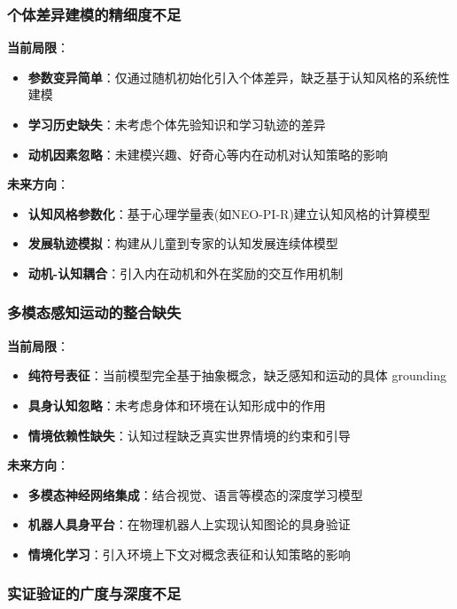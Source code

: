 \documentclass[12pt,a4paper]{article}
\begin{document}
\subsubsection{个体差异建模的精细度不足}

\textbf{当前局限}：
\begin{itemize}
\item \textbf{参数变异简单}：仅通过随机初始化引入个体差异，缺乏基于认知风格的系统性建模
\item \textbf{学习历史缺失}：未考虑个体先验知识和学习轨迹的差异
\item \textbf{动机因素忽略}：未建模兴趣、好奇心等内在动机对认知策略的影响
\end{itemize}

\textbf{未来方向}：
\begin{itemize}
\item \textbf{认知风格参数化}：基于心理学量表(如NEO-PI-R)建立认知风格的计算模型
\item \textbf{发展轨迹模拟}：构建从儿童到专家的认知发展连续体模型
\item \textbf{动机-认知耦合}：引入内在动机和外在奖励的交互作用机制
\end{itemize}

\subsubsection{多模态感知运动的整合缺失}

\textbf{当前局限}：
\begin{itemize}
\item \textbf{纯符号表征}：当前模型完全基于抽象概念，缺乏感知和运动的具体 grounding
\item \textbf{具身认知忽略}：未考虑身体和环境在认知形成中的作用
\item \textbf{情境依赖性缺失}：认知过程缺乏真实世界情境的约束和引导
\end{itemize}

\textbf{未来方向}：
\begin{itemize}
\item \textbf{多模态神经网络集成}：结合视觉、语言等模态的深度学习模型
\item \textbf{机器人具身平台}：在物理机器人上实现认知图论的具身验证
\item \textbf{情境化学习}：引入环境上下文对概念表征和认知策略的影响
\end{itemize}

\subsubsection{实证验证的广度与深度不足}
\end{document}
